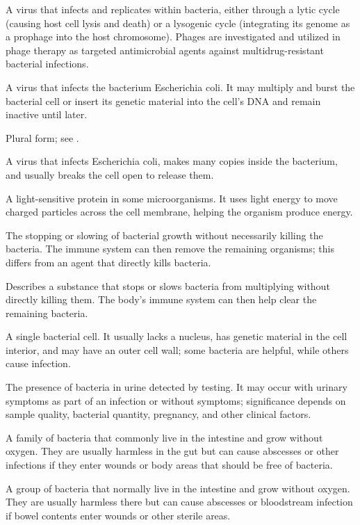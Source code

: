  A virus that infects and replicates within bacteria, either through a lytic cycle (causing host cell lysis and death) or a lysogenic cycle (integrating its genome as a prophage into the host chromosome). Phages are investigated and utilized in phage therapy as targeted antimicrobial agents against multidrug-resistant bacterial infections.

 A virus that infects the bacterium Escherichia coli. It may multiply and burst the bacterial cell or insert its genetic material into the cell’s DNA and remain inactive until later.

 Plural form; see .

 A virus that infects Escherichia coli, makes many copies inside the bacterium, and usually breaks the cell open to release them.

 A light-sensitive protein in some microorganisms. It uses light energy to move charged particles across the cell membrane, helping the organism produce energy.

 The stopping or slowing of bacterial growth without necessarily killing the bacteria. The immune system can then remove the remaining organisms; this differs from an agent that directly kills bacteria.

 Describes a substance that stops or slows bacteria from multiplying without directly killing them. The body's immune system can then help clear the remaining bacteria.

 A single bacterial cell. It usually lacks a nucleus, has genetic material in the cell interior, and may have an outer cell wall; some bacteria are helpful, while others cause infection.

 The presence of bacteria in urine detected by testing. It may occur with urinary symptoms as part of an infection or without symptoms; significance depends on sample quality, bacterial quantity, pregnancy, and other clinical factors.

 A family of bacteria that commonly live in the intestine and grow without oxygen. They are usually harmless in the gut but can cause abscesses or other infections if they enter wounds or body areas that should be free of bacteria.

 A group of bacteria that normally live in the intestine and grow without oxygen. They are usually harmless there but can cause abscesses or bloodstream infection if bowel contents enter wounds or other sterile areas.

